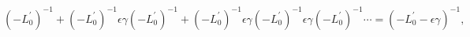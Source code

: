 \begin{equation}
(-L_{0}^{\prime })^{-1}+(-L_{0}^{\prime })^{-1}\epsilon \gamma
(-L_{0}^{\prime })^{-1}+(-L_{0}^{\prime })^{-1}\epsilon \gamma
(-L_{0}^{\prime })^{-1}\epsilon \gamma (-L_{0}^{\prime })^{-1}\cdots
=(-L_{0}^{\prime }-\epsilon \gamma )^{-1},
\end{equation}%

